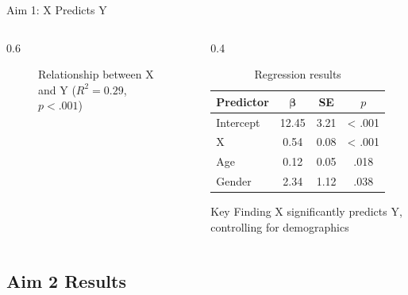 \documentclass[aspectratio=169,11pt]{beamer}
\begin{document}
\begin{frame}{Aim 1: X Predicts Y}
  \begin{columns}[c]

    \begin{column}{0.6\textwidth}
      \begin{figure}
        \centering
        \caption{Relationship between X and Y ($R^2 = 0.29$, $p < .001$)}
      \end{figure}
    \end{column}

    \begin{column}{0.4\textwidth}
      \begin{table}
        \centering
        \caption{Regression results}
        \tiny
        \begin{tabular}{lccc}
          \toprule
          \textbf{Predictor} & $\boldsymbol{\beta}$ & \textbf{SE} & \textbf{$p$} \\
          \midrule
          Intercept & 12.45 & 3.21 & < .001 \\
          X & 0.54 & 0.08 & < .001 \\
          Age & 0.12 & 0.05 & .018 \\
          Gender & 2.34 & 1.12 & .038 \\
          \bottomrule
        \end{tabular}
      \end{table}

      \vspace{0.3cm}

      \begin{block}{Key Finding}
        X significantly predicts Y, controlling for demographics
      \end{block}
    \end{column}

  \end{columns}
\end{frame}

\subsection{Aim 2 Results}
\end{document}
